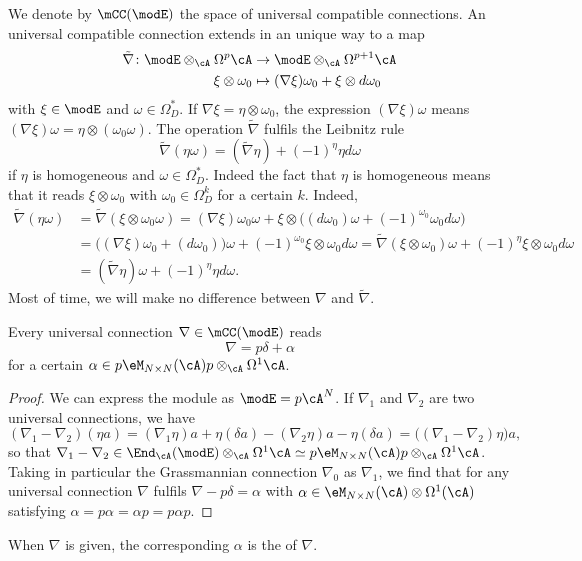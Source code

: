  We denote by $\mCC(\modE)$ the space of universal compatible connections. An universal compatible connection extends in an unique way to a map 
\begin{equation}
\begin{aligned}
\tilde\nabla\colon \modE\otimes_{\cA}\Omega^p\cA&\to \modE\otimes_{\cA}\Omega^{p+1}\cA\\
\xi\otimes\omega_0&\mapsto (\nabla\xi)\omega_0+\xi\otimes d\omega_0
\end{aligned}
\end{equation}
with $\xi\in\modE$ and $\omega\in\Omega^*_D$. If $\nabla\xi=\eta\otimes\omega_0$, the expression $(\nabla\xi)\omega$ means $(\nabla\xi)\omega=\eta\otimes(\omega_0\omega)$. The operation $\tilde\nabla$ fulfils the Leibnitz rule
\[ 
  \tilde\nabla(\eta\omega)=(\tilde\nabla\eta)+(-1)^{\eta}\eta d\omega
\]
if $\eta$ is homogeneous and $\omega\in\Omega^*_D$. Indeed the fact that $\eta$ is homogeneous means that it reads $\xi\otimes\omega_0$ with $\omega_0\in\Omega_D^k$     for a certain $k$. Indeed,
\[ 
\begin{split}
 \tilde\nabla(\eta\omega)&=\tilde\nabla(\xi\otimes\omega_0\omega)=(\nabla\xi)\omega_0\omega+\xi\otimes\big( (d\omega_0)\omega+(-1)^{\omega_0}\omega_0 d\omega \big)\\
		&=\big( (\nabla\xi)\omega_0+(d\omega_0) \big)\omega+(-1)^{\omega_0}\xi\otimes\omega_0 d\omega
		=\tilde\nabla(\xi\otimes\omega_0)\omega+(-1)^{\eta}\xi\otimes\omega_0 d\omega\\
		&=(\tilde\nabla\eta)\omega+(-1)^{\eta}\eta d\omega.
\end{split}  
\]
Most of time, we will make no difference between $\nabla$ and $\tilde\nabla$.

\begin{lemma}
Every universal connection $\nabla\in\mCC(\modE)$ reads
\begin{equation}\label{EqDefConnpdapha}
\nabla = p\delta+\alpha
\end{equation}
for a certain $\alpha\in p\eM_{N\times N}(\cA)p\otimes_{\cA}\Omega^1\cA$.
\end{lemma}

\begin{proof}
We can express the module as $\modE=p\cA^N$. If $\nabla_1$ and $\nabla_2$ are two universal connections, we have
\[ 
(\nabla_1-\nabla_2)(\eta a)=(\nabla_1\eta)a+\eta(\delta a)-(\nabla_2\eta)a-\eta(\delta a)=\big( (\nabla_1-\nabla_2)\eta \big)a,
\]
so that $\nabla_1-\nabla_2\in\End_{\cA}(\modE)\otimes_{\cA}\Omega^1\cA\simeq p\eM_{N\times N}(\cA)p\otimes_{\cA}\Omega^1\cA$. Taking in particular the Grassmannian connection $\nabla_0$ as $\nabla_1$, we find that for any universal connection $\nabla$ fulfils $\nabla-p\delta=\alpha$ with $\alpha\in\eM_{N\times N}(\cA)\otimes\Omega^1(\cA)$ satisfying $\alpha=p\alpha=\alpha p=p\alpha p$. 
\end{proof}
When $\nabla$ is given, the corresponding $\alpha$ is the  of $\nabla$. 


